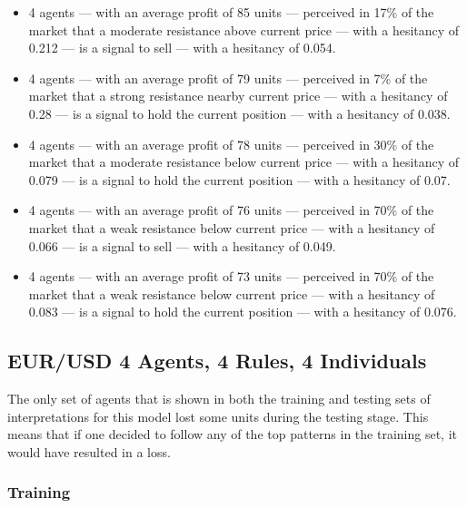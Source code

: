 {\small
  \begin{itemize}
  \item 4 agents — with an average profit of 85 units — perceived in 17\% of the
    market that a moderate resistance above current price — with a hesitancy of
    0.212 — is a signal to sell — with a hesitancy of 0.054.
  \item 4 agents — with an average profit of 79 units — perceived in 7\% of the
    market that a strong resistance nearby current price — with a hesitancy of
    0.28 — is a signal to hold the current position — with a hesitancy of 0.038.
  \item 4 agents — with an average profit of 78 units — perceived in 30\% of the
    market that a moderate resistance below current price — with a hesitancy of
    0.079 — is a signal to hold the current position — with a hesitancy of 0.07.
  \item 4 agents — with an average profit of 76 units — perceived in 70\% of the
    market that a weak resistance below current price — with a hesitancy of
    0.066 — is a signal to sell — with a hesitancy of 0.049.
  \item 4 agents — with an average profit of 73 units — perceived in 70\% of the
    market that a weak resistance below current price — with a hesitancy of
    0.083 — is a signal to hold the current position — with a hesitancy of
    0.076.
  \end{itemize}
}




\subsection{EUR/USD 4 Agents, 4 Rules, 4 Individuals}
\label{}

The only set of agents that is shown in both the training and testing sets of interpretations for this model lost some units during the testing stage. This means that if one decided to follow any of the top patterns in the training set, it would have resulted in a loss.

\subsubsection{Training}
\label{}

